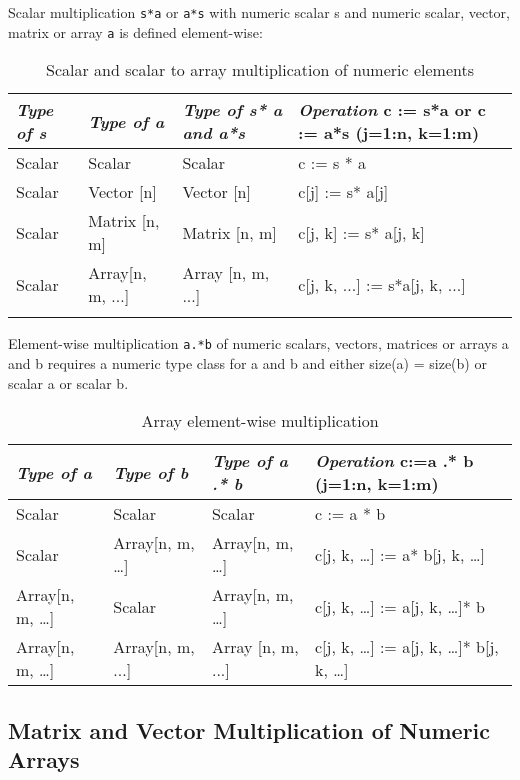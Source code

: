 Scalar multiplication \lstinline!s*a! or \lstinline!a*s! with numeric scalar s and numeric
scalar, vector, matrix or array \lstinline!a! is defined element-wise:

\begin{longtable}[]{|l|l|l|l|}
\caption{Scalar and scalar to array multiplication of numeric elements}\\
\hline
\emph{Type of s} & \emph{Type of a} & \emph{Type of s* a and a*s} &
\emph{Operation} c := s*a or c := a*s (j=1:n, k=1:m)\\ \hline
\endhead
Scalar & Scalar & Scalar & c := s * a\\ \hline
Scalar & Vector {[}n{]} & Vector {[}n{]} & c{[}j{]} := s*
a{[}j{]}\\ \hline
Scalar & Matrix {[}n, m{]} & Matrix {[}n, m{]} & c{[}j, k{]} := s*
a{[}j, k{]}\\ \hline
Scalar & Array{[}n, m, ...{]} & Array {[}n, m, ...{]} & c{[}j, k, ...{]}
:= s*a{[}j, k, ...{]}\\ \hline
\label{tab:product}
\end{longtable}

Element-wise multiplication \lstinline!a.*b! of numeric scalars, vectors, matrices
or arrays a and b requires a numeric type class for a and b and either
size(a) = size(b) or scalar a or scalar b.

\begin{longtable}[]{|l|l|l|l|}
\caption{Array element-wise multiplication}\\
\hline
\emph{Type of a} & \emph{Type of b} & \emph{Type of a .* b} &
\emph{Operation} c:=a .* b (j=1:n, k=1:m)\\ \hline
\endhead
Scalar & Scalar & Scalar & c := a * b\\ \hline
Scalar & Array{[}n, m, \ldots{}{]} & Array{[}n, m, \ldots{}{]} & c{[}j,
k, \ldots{}{]} := a* b{[}j, k, \ldots{}{]}\\ \hline
Array{[}n, m, \ldots{}{]} & Scalar & Array{[}n, m, \ldots{}{]} & c{[}j,
k, \ldots{}{]} := a{[}j, k, \ldots{}{]}* b\\ \hline
Array{[}n, m, \ldots{}{]} & Array{[}n, m, ...{]} & Array {[}n, m, ...{]}
& c{[}j, k, \ldots{}{]} := a{[}j, k, \ldots{}{]}* b{[}j, k,
\ldots{}{]}\\ \hline
\end{longtable}

\subsection{Matrix and Vector Multiplication of Numeric Arrays}

